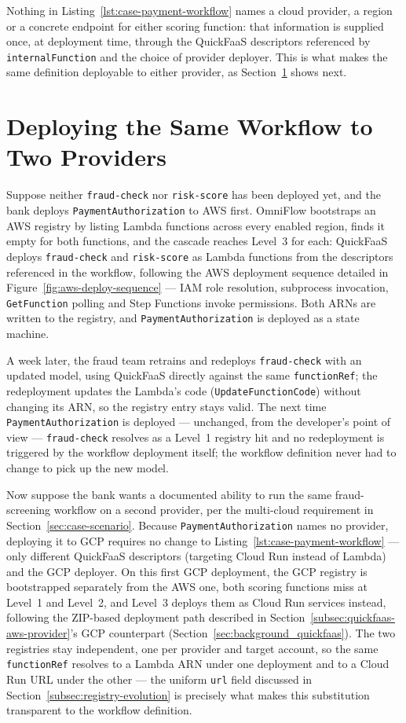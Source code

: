 Nothing in Listing~\ref{lst:case-payment-workflow} names a cloud provider, a region or a concrete
endpoint for either scoring function: that information is supplied once, at deployment time,
through the QuickFaaS descriptors referenced by \texttt{internalFunction} and the choice of
provider deployer. This is what makes the same definition deployable to either provider, as
Section~\ref{sec:case-deployment} shows next.

\section{Deploying the Same Workflow to Two Providers}
\label{sec:case-deployment}

Suppose neither \texttt{fraud-check} nor \texttt{risk-score} has been deployed yet, and the bank
deploys \texttt{PaymentAuthorization} to AWS first. OmniFlow bootstraps an AWS registry by
listing Lambda functions across every enabled region, finds it empty for both functions, and the
cascade reaches Level~3 for each: QuickFaaS deploys \texttt{fraud-check} and \texttt{risk-score}
as Lambda functions from the descriptors referenced in the workflow, following the AWS deployment
sequence detailed in Figure~\ref{fig:aws-deploy-sequence} --- IAM role resolution, subprocess
invocation, \texttt{GetFunction} polling and Step Functions invoke permissions. Both ARNs are
written to the registry, and \texttt{PaymentAuthorization} is deployed as a state machine.

A week later, the fraud team retrains and redeploys \texttt{fraud-check} with an updated model,
using QuickFaaS directly against the same \texttt{functionRef}; the redeployment updates the
Lambda's code (\texttt{UpdateFunctionCode}) without changing its ARN, so the registry entry stays
valid. The next time \texttt{PaymentAuthorization} is deployed --- unchanged, from the developer's
point of view --- \texttt{fraud-check} resolves as a Level~1 registry hit and no redeployment is
triggered by the workflow deployment itself; the workflow definition never had to change to pick
up the new model.

Now suppose the bank wants a documented ability to run the same fraud-screening workflow on a
second provider, per the multi-cloud requirement in Section~\ref{sec:case-scenario}. Because
\texttt{PaymentAuthorization} names no provider, deploying it to GCP requires no change to
Listing~\ref{lst:case-payment-workflow} --- only different QuickFaaS descriptors (targeting Cloud
Run instead of Lambda) and the GCP deployer. On this first GCP deployment, the GCP registry is
bootstrapped separately from the AWS one, both scoring functions miss at Level~1 and Level~2, and
Level~3 deploys them as Cloud Run services instead, following the ZIP-based deployment path
described in Section~\ref{subsec:quickfaas-aws-provider}'s GCP counterpart
(Section~\ref{sec:background_quickfaas}). The two registries stay independent, one per provider
and target account, so the same \texttt{functionRef} resolves to a Lambda ARN under one deployment
and to a Cloud Run URL under the other --- the uniform \texttt{url} field discussed in
Section~\ref{subsec:registry-evolution} is precisely what makes this substitution transparent to
the workflow definition.

